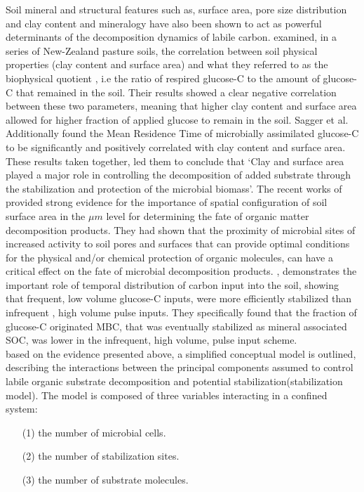 	Soil mineral and structural features such as, surface area, pore size distribution and clay content and mineralogy have also been shown to act as powerful determinants of the decomposition dynamics of labile carbon. \citet{saggar1999} examined, in a series of New-Zealand pasture soils, the correlation between soil physical properties (clay content and surface area) and what they referred to as the biophysical quotient , i.e the ratio of respired glucose-C to the amount of glucose-C that remained in the soil. Their results showed a clear negative correlation between these two parameters, meaning that higher clay content and surface area allowed for higher fraction of applied glucose to remain in the soil. Sagger et al. Additionally found the Mean Residence Time of microbially assimilated glucose-C to be significantly and positively correlated with clay content and surface area. These results taken together, led them to conclude that ‘Clay and surface area played a major role in controlling the decomposition of added substrate through the stabilization and protection of the microbial biomass’\citep[p. 12]{saggar1999}. The recent works of \citet{kravchenko2019, kravchenko2015} provided strong evidence for the importance of spatial configuration of soil surface area in the $ \mu m $ level for determining the fate of organic matter decomposition products. They had shown that the proximity of microbial sites of increased activity to soil pores and surfaces that can provide optimal conditions for the physical and/or chemical protection of organic molecules, can have a critical effect on the fate of microbial decomposition products.
	\citet{sokol2019c}, demonstrates the important role of temporal distribution of carbon input into the soil, showing that frequent, low volume glucose-C inputs, were more efficiently stabilized than infrequent , high volume pulse inputs. They specifically found that the fraction of glucose-C originated MBC, that was eventually stabilized as mineral associated SOC, was lower in the infrequent, high volume, pulse input scheme.\\
	based on the evidence presented above,  a simplified conceptual model is outlined, describing the interactions between the principal components assumed to control labile organic substrate decomposition and potential stabilization(stabilization model). The model is composed of three variables interacting in a confined system:
	\begin{enumerate}
		\item [(1)] the number of microbial cells.
		\item [(2)] the number of stabilization sites.
		\item [(3)]the number of substrate molecules.
	\end{enumerate}

